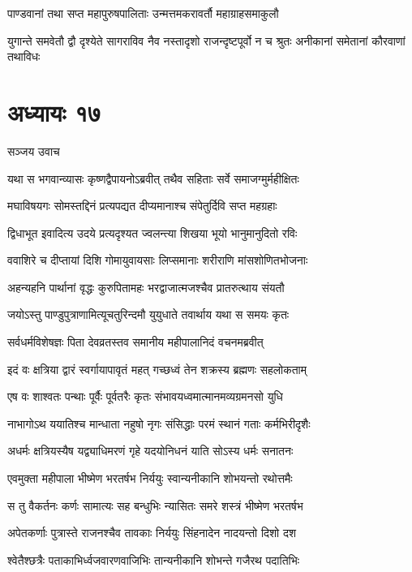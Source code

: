 \twolineshloka
{पाण्डवानां तथा सप्त महापुरुषपालिताः}
{उन्मत्तमकरावर्तौ महाग्राहसमाकुलौ}


\threelineshloka
{युगान्ते समवेतौ द्वौ दृश्येते सागराविव}
{नैव नस्तादृशो राजन्दृष्टपूर्वो न च श्रुतः}
{अनीकानां समेतानां कौरवाणां तथाविधः}


\chapter{अध्यायः १७}
\twolineshloka
{सञ्जय उवाच}
{}


\twolineshloka
{यथा स भगवान्व्यासः कृष्णद्वैपायनोऽब्रवीत्}
{तथैव सहिताः सर्वे समाजग्मुर्महीक्षितः}


\twolineshloka
{मघाविषयगः सोमस्तद्दिनं प्रत्यपद्यत}
{दीप्यमानाश्च संपेतुर्दिवि सप्त महग्रहाः}


\twolineshloka
{द्विधाभूत इवादित्य उदये प्रत्यदृश्यत}
{ज्वलन्त्या शिखया भूयो भानुमानुदितो रविः}


\twolineshloka
{ववाशिरे च दीप्तायां दिशि गोमायुवायसाः}
{लिप्समानाः शरीराणि मांसशोणितभोजनाः}


\twolineshloka
{अहन्यहनि पार्थानां वृद्धः कुरुपितामहः}
{भरद्वाजात्मजश्चैव प्रातरुत्थाय संयतौ}


\twolineshloka
{जयोऽस्तु पाण्डुपुत्राणामित्यूचतुरिन्दमौ}
{युयुधाते तवार्थाय यथा स समयः कृतः}


\twolineshloka
{सर्वधर्मविशेषज्ञः पिता देवव्रतस्तव}
{समानीय महीपालानिदं वचनमब्रवीत्}


\twolineshloka
{इदं वः क्षत्रिया द्वारं स्वर्गायापावृतं महत्}
{गच्छध्वं तेन शक्रस्य ब्रह्मणः सहलोकताम्}


\twolineshloka
{एष वः शाश्वतः पन्थाः पूर्वैः पूर्वतरैः कृतः}
{संभावयध्वमात्मानमव्यग्रमनसो युधि}


\twolineshloka
{नाभागोऽथ ययातिश्च मान्धाता नहुषो नृगः}
{संसिद्धाः परमं स्थानं गताः कर्मभिरीदृशैः}


\twolineshloka
{अधर्मः क्षत्रियस्यैष यद्व्याधिमरणं गृहे}
{यदयोनिधनं याति सोऽस्य धर्मः सनातनः}


\twolineshloka
{एवमुक्ता महीपाला भीष्मेण भरतर्षभ}
{निर्ययुः स्वान्यनीकानि शोभयन्तो रथोत्तमैः}


\twolineshloka
{स तु वैकर्तनः कर्णः सामात्यः सह बन्धुभिः}
{न्यासितः समरे शस्त्रं भीष्मेण भरतर्षभ}


\twolineshloka
{अपेतकर्णाः पुत्रास्ते राजनश्चैव तावकाः}
{निर्ययुः सिंहनादेन नादयन्तो दिशो दश}


\twolineshloka
{श्वेतैश्छत्रैः पताकाभिर्ध्वजवारणवाजिभिः}
{तान्यनीकानि शोभन्ते गजैरथ पदातिभिः}


